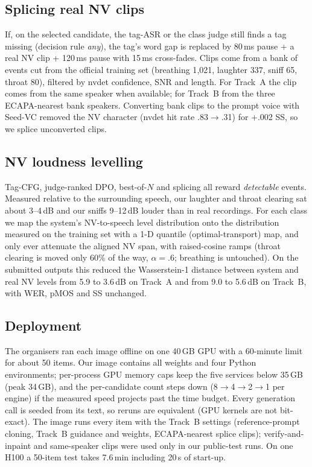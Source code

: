 \documentclass[11pt]{article}
\begin{document}
\subsection{Splicing real NV clips}
If, on the selected candidate, the tag-ASR or the class judge still finds a tag missing (decision rule \emph{any}),
the tag's word gap is replaced by 80\,ms pause + a real NV clip + 120\,ms pause with 15\,ms cross-fades. Clips come from
a bank of events cut from the official training set (breathing 1{,}021, laughter 337, sniff 65, throat 80), filtered by
nvdet confidence, SNR and length. For Track~A the clip comes from the same speaker when available; for Track~B from the
three ECAPA-nearest bank speakers. Converting bank clips to the prompt voice with Seed-VC removed the NV character
(nvdet hit rate .83$\rightarrow$.31) for +.002 SS, so we splice unconverted clips.

\subsection{NV loudness levelling}
Tag-CFG, judge-ranked DPO, best-of-$N$ and splicing all reward \emph{detectable} events. Measured relative to the
surrounding speech, our laughter and throat clearing sat about 3--4\,dB and our sniffs 9--12\,dB louder than in
real recordings. For each class
we map the system's NV-to-speech level distribution onto the distribution measured on the training set with a 1-D
quantile (optimal-transport) map, and only ever attenuate the aligned NV span, with raised-cosine ramps (throat clearing
is moved only 60\% of the way, $\alpha{=}.6$; breathing is untouched). On the submitted outputs this reduced the
Wasserstein-1 distance between system and real NV levels from 5.9 to 3.6\,dB on Track~A and from 9.0 to 5.6\,dB on
Track~B, with WER, pMOS and SS unchanged.

\subsection{Deployment}
The organisers ran each image offline on one 40\,GB GPU with a 60-minute limit for about 50 items. Our image
contains all weights and four Python environments; per-process GPU memory caps keep the five services below 35\,GB
(peak 34\,GB), and
the per-candidate count steps down (8$\rightarrow$4$\rightarrow$2$\rightarrow$1 per engine) if the measured speed
projects past the time budget. Every generation call is seeded from its text, so reruns are equivalent (GPU kernels are not
bit-exact). The image runs every item with the Track~B settings (reference-prompt cloning, Track~B guidance and
weights, ECAPA-nearest splice clips); verify-and-inpaint and same-speaker clips were used only in our public-test runs.
On one H100 a 50-item test takes 7.6\,min including 20\,s of start-up.
\end{document}
